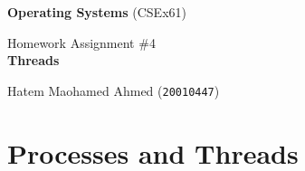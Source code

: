 \documentclass[a4paper,12pt,fleqn]{article}
\newcommand{\coursename}{Operating Systems}
\newcommand{\coursecode}{CSEx61}
\newcommand{\assigntype}{Homework Assignment \#4 \\ \textbf{Threads}}
\newcommand{\teacher}{Hatem Maohamed Ahmed (\texttt{20010447})}
\begin{document}
%
%

\noindent\makebox[\linewidth]{\rule{\textwidth}{0.4pt}}

\begin{center}
\Large \textbf{\coursename} (\coursecode)
\end{center}

\begin{center}
\large \assigntype{} \\
\vspace{3mm}
\end{center}

\begin{center}
\teacher\\

\end{center}

\noindent\makebox[\linewidth]{\rule{\textwidth}{0.4pt}}


%
%


\section{Processes and Threads}
\end{document}
